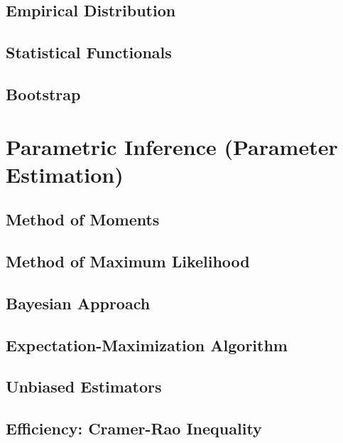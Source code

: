 \documentclass[
  openany]{book}
\theoremstyle{definition}
\theoremstyle{definition}
\theoremstyle{definition}
\theoremstyle{definition}
\theoremstyle{remark}
\begin{document}
\section{Empirical Distribution}\label{empirical-distribution}

\section{Statistical Functionals}\label{statistical-functionals}

\section{Bootstrap}\label{bootstrap}

\chapter{Parametric Inference (Parameter Estimation)}\label{parametric-inference-parameter-estimation}

\section{Method of Moments}\label{method-of-moments}

\section{Method of Maximum Likelihood}\label{method-of-maximum-likelihood}

\section{Bayesian Approach}\label{bayesian-approach}

\section{Expectation-Maximization Algorithm}\label{expectation-maximization-algorithm}

\section{Unbiased Estimators}\label{unbiased-estimators}

\section{Efficiency: Cramer-Rao Inequality}\label{efficiency-cramer-rao-inequality}
\end{document}
